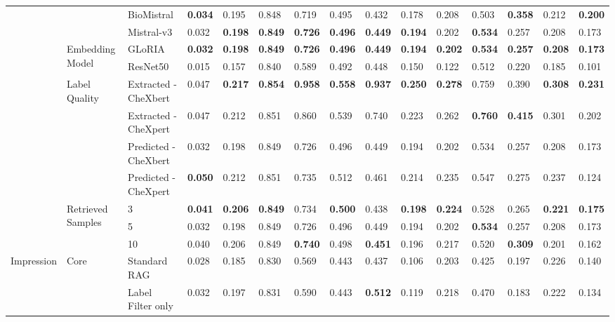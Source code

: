 \begin{tabular}{lllllllllllllll}
 &  & BioMistral & \textbf{0.034} & 0.195 & 0.848 & 0.719 & 0.495 & 0.432 & 0.178 & 0.208 & 0.503 & \textbf{0.358} & 0.212 & \textbf{0.200} \\
 &  & Mistral-v3 & 0.032 & \textbf{0.198} & \textbf{0.849} & \textbf{0.726} & \textbf{0.496} & \textbf{0.449} & \textbf{0.194} & 0.202 & \textbf{0.534} & 0.257 & 0.208 & 0.173 \\
\cmidrule{2-15}
 & \multirow[c]{2}{*}{Embedding Model} & GLoRIA & \textbf{0.032} & \textbf{0.198} & \textbf{0.849} & \textbf{0.726} & \textbf{0.496} & \textbf{0.449} & \textbf{0.194} & \textbf{0.202} & \textbf{0.534} & \textbf{0.257} & \textbf{0.208} & \textbf{0.173} \\
 &  & ResNet50 & 0.015 & 0.157 & 0.840 & 0.589 & 0.492 & 0.448 & 0.150 & 0.122 & 0.512 & 0.220 & 0.185 & 0.101 \\
\cmidrule{2-15}
 & \multirow[c]{4}{*}{Label Quality} & Extracted - CheXbert & 0.047 & \textbf{0.217} & \textbf{0.854} & \textbf{0.958} & \textbf{0.558} & \textbf{0.937} & \textbf{0.250} & \textbf{0.278} & 0.759 & 0.390 & \textbf{0.308} & \textbf{0.231} \\
 &  & Extracted - CheXpert & 0.047 & 0.212 & 0.851 & 0.860 & 0.539 & 0.740 & 0.223 & 0.262 & \textbf{0.760} & \textbf{0.415} & 0.301 & 0.202 \\
 &  & Predicted - CheXbert & 0.032 & 0.198 & 0.849 & 0.726 & 0.496 & 0.449 & 0.194 & 0.202 & 0.534 & 0.257 & 0.208 & 0.173 \\
 &  & Predicted - CheXpert & \textbf{0.050} & 0.212 & 0.851 & 0.735 & 0.512 & 0.461 & 0.214 & 0.235 & 0.547 & 0.275 & 0.237 & 0.124 \\
\cmidrule{2-15}
 & \multirow[c]{3}{*}{Retrieved Samples} & 3 & \textbf{0.041} & \textbf{0.206} & \textbf{0.849} & 0.734 & \textbf{0.500} & 0.438 & \textbf{0.198} & \textbf{0.224} & 0.528 & 0.265 & \textbf{0.221} & \textbf{0.175} \\
 &  & 5 & 0.032 & 0.198 & 0.849 & 0.726 & 0.496 & 0.449 & 0.194 & 0.202 & \textbf{0.534} & 0.257 & 0.208 & 0.173 \\
 &  & 10 & 0.040 & 0.206 & 0.849 & \textbf{0.740} & 0.498 & \textbf{0.451} & 0.196 & 0.217 & 0.520 & \textbf{0.309} & 0.201 & 0.162 \\
\cmidrule{1-15} \cmidrule{2-15}
\multirow[c]{23}{*}{Impression} & \multirow[c]{4}{*}{Core} & Standard RAG & 0.028 & 0.185 & 0.830 & 0.569 & 0.443 & 0.437 & 0.106 & 0.203 & 0.425 & 0.197 & 0.226 & 0.140 \\
 &  & Label Filter only & 0.032 & 0.197 & 0.831 & 0.590 & 0.443 & \textbf{0.512} & 0.119 & 0.218 & 0.470 & 0.183 & 0.222 & 0.134 \\

\end{tabular}
